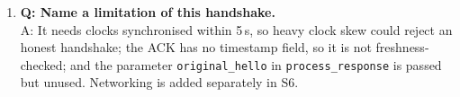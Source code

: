 \documentclass[11pt,a4paper]{article}
\begin{document}
\begin{enumerate}
        A: \texttt{ecdsa\_verify} returns \texttt{False}, and
        \texttt{process\_challenge} (or \texttt{process\_response}) raises
        \texttt{AuthError} --- ``Challenge signature invalid, possible
        impersonation''.
  \item \textbf{Q: Name a limitation of this handshake.}\\
        A: It needs clocks synchronised within 5\,s, so heavy clock skew could
        reject an honest handshake; the ACK has no timestamp field, so it is not
        freshness-checked; and the parameter \texttt{original\_hello} in
        \texttt{process\_response} is passed but unused. Networking is added
        separately in S6.
\end{enumerate}

\end{document}
